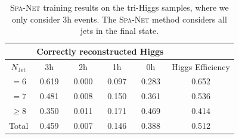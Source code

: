 \documentclass[12pt]{article}
\begin{document}
    \begin{table}[htpb]
		\centering
        \caption{\textsc{Spa-Net} training results on the tri-Higgs samples, where we only consider 3h events. The \textsc{Spa-Net} method considers all jets in the final state.}
		\label{tab:SPANet_triHiggs_3h_new}
		\begin{tabular}{c|cccc|c}
			\multicolumn{1}{l|}{} & \multicolumn{4}{c|}{Correctly reconstructed Higgs} & \multicolumn{1}{l}{} \\ \hline
			$N_\text{Jet}$        & 3h          & 2h         & 1h         & 0h         & Higgs Efficiency     \\ \hline
			$=6$                  & 0.619 & 0.000 & 0.097 & 0.283 &  0.652                \\
			$=7$                  & 0.481 & 0.008 & 0.150 & 0.361 &  0.536                \\
			$\ge 8$               & 0.350 & 0.011 & 0.171 & 0.469 &  0.414                \\ \hline
			Total                 & 0.459 & 0.007 & 0.146 & 0.388 &  0.512               
		\end{tabular}
	\end{table}


		
\end{document}
